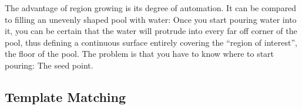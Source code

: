 The advantage of region growing is its degree of automation.  It can
be compared to filling an unevenly shaped pool with water: Once you
start pouring water into it, you can be certain that the water will
protrude into every far off corner of the pool, thus defining a
continuous surface entirely covering the ``region of interest'', the
floor of the pool.  The problem is that you have to know where to
start pouring: The seed point.

\subsection{Template Matching}
\label{image:segment:template}

